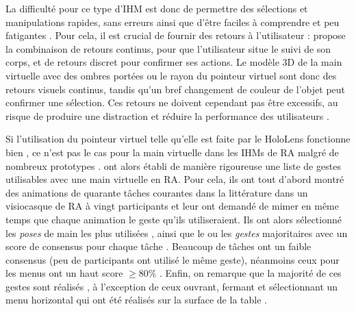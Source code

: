 La difficulté pour ce type d'IHM est donc de permettre des sélections et manipulations rapides, sans erreurs ainsi que d'être faciles à comprendre et peu fatigantes \citep{Argelaguet2013}. Pour cela, il est crucial de fournir des retours à l'utilisateur : \cite{Chan2010} propose la combinaison de retours continus, pour que l'utilisateur situe le suivi de son corps, et de retours discret pour confirmer ses actions. Le modèle 3D de la main virtuelle avec des ombres portées ou le rayon du pointeur virtuel sont donc des retours visuels continus, tandis qu'un bref changement de couleur de l'objet peut confirmer une sélection. Ces retours ne doivent cependant pas être excessifs, au risque de produire une distraction et réduire la performance des utilisateurs \citep{Argelaguet2013}.



Si l'utilisation du pointeur virtuel telle qu'elle est faite par le HoloLens fonctionne bien \citep{Kytoe2018}, ce n'est pas le cas pour la main virtuelle dans les IHMs de RA malgré de nombreux prototypes \citep{Piumsomboon2013}. \citeauthor{Piumsomboon2013} ont alors établi de manière rigoureuse une liste de gestes utilisables avec une main virtuelle en RA. Pour cela, ils ont tout d'abord montré des animations de quarante tâches courantes dans la littérature dans un visiocasque de RA à vingt participants et leur ont demandé de mimer en même temps que chaque animation le geste qu'ils utiliseraient. Ils ont alors sélectionné les \emph{poses} de main les plus utilisées , ainsi que le ou les \emph{gestes} majoritaires avec un score de consensus pour chaque tâche . Beaucoup de tâches ont un faible consensus (peu de participants ont utilisé le même geste), néanmoins ceux pour les menus ont un haut score $\geq 80\%$ . Enfin, on remarque que la majorité de ces gestes sont réalisés , à l'exception de ceux ouvrant, fermant et sélectionnant un menu horizontal qui ont été réalisés sur la surface de la table .

